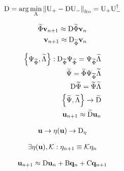 \begin{align}
    \matr{D} = \arg \min_{\matr{A}} \norm[\text{fro}]{\matr{U}_{+} - \matr{D} \matr{U}_{-}} = \matr{U}_{+} \matr{U}_{-}^{\dagger}
\end{align}

\begin{align}
    \widetilde{\Phi} \vunk_{n+1} \approx  \matr{D} \widetilde{\Phi} \vunk_{n} \\
    \vunk_{n+1} \approx  \matr{D}_{\widetilde{\Phi}} \vunk_{n} \\
\end{align}

\begin{align}
    \left\{ \Psi_{\widetilde{\Phi}},  \widetilde{\Lambda} \right\} : \matr{D}_{\widetilde{\Phi}}  \Psi_{\widetilde{\Phi}} = \Psi_{\widetilde{\Phi}} \widetilde{\Lambda} \\
    \widetilde{\Psi} = \widetilde{\Phi} \Psi_{\widetilde{\Phi}} \widetilde{\Lambda} \\
    \matr{D} \widetilde{\Psi} = \widetilde{\Psi}\widetilde{\Lambda} \\
    \left\{\widetilde{\Psi},  \widetilde{\Lambda} \right\} \rightarrow \widetilde{\matr{D}}\\
    \unk_{n+1} \approx \widetilde{\matr{D}} \unk_{n}
\end{align}

\begin{align}
   \unk \rightarrow \nlin(\unk) \rightarrow \matr{D}_{\nlin}
\end{align}

\begin{align}
    \exists \nlin(\unk), \matr{\mathcal{K}} : \nlin_{n+1} \equiv \matr{\mathcal{K}}  \nlin_{n}
 \end{align}

\begin{align}
    \unk_{n+1} \approx \matr{D} \unk_{n} + \matr{B} \bvec{q}_{n} + \matr{C} \bvec{q}_{n+1}
\end{align}

\subsection{}

\subsubsection{}

